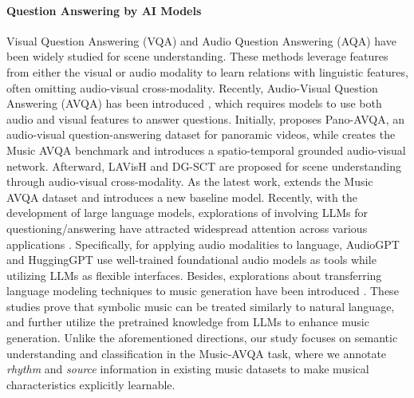\documentclass[11pt]{article}
\begin{document}
\paragraph{Question Answering by AI Models}
Visual Question Answering (VQA) \cite{antol2015vqa, lei2018tvqa, yu2019activitynet, garcia2020knowit, ravi2023vlc, yu2024self} and Audio Question Answering (AQA) \cite{fayek2020temporal, lipping2022clotho, sudarsanam2023attention, li2023multi} have been widely studied for scene understanding. These methods leverage features from either the visual or audio modality to learn relations with linguistic features, often omitting audio-visual cross-modality. Recently, Audio-Visual Question Answering (AVQA) has been introduced \cite{yun2021pano, li2022learning}, which requires models to use both audio and visual features to answer questions. Initially, \citet{yun2021pano} proposes Pano-AVQA, an audio-visual question-answering dataset for panoramic videos, while \citet{li2022learning} creates the Music AVQA benchmark and introduces a spatio-temporal grounded audio-visual network. Afterward, LAVisH \cite{lin2023vision} and DG-SCT \cite{duan2024cross} are proposed for scene understanding through audio-visual cross-modality. As the latest work, \citet{liu2024tackling} extends the Music AVQA dataset and introduces a new baseline model. Recently, with the development of large language models, explorations of involving LLMs for questioning/answering have attracted widespread attention across various applications \cite{zhuang2023toolqa, wang2024healthq, saito2024unsupervised}. Specifically, for applying audio modalities to language, AudioGPT \cite{huang2024audiogpt} and HuggingGPT \cite{shen2024hugginggpt} use well-trained foundational audio models as tools while utilizing LLMs as flexible interfaces. Besides, explorations about transferring language modeling techniques to music generation have been introduced \cite{copet2024simple, dai2022missing, agostinelli2023musiclm, lu2023musecoco}. These studies prove that symbolic music can be treated similarly to natural language, and further utilize the pretrained knowledge from LLMs to enhance music generation. Unlike the aforementioned directions, our study focuses on semantic understanding and classification in the Music-AVQA task, where we annotate \textit{rhythm} and \textit{source} information in existing music datasets to make musical characteristics explicitly learnable.
\end{document}
